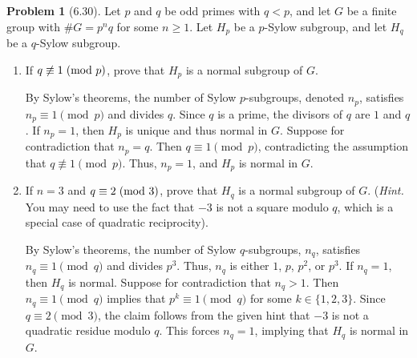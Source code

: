 \documentclass[12pt]{article}
\theoremstyle{definition}
\newtheorem{problem}{Problem}
\begin{document}
\begin{problem}[6.30]
    Let $p$ and $q$ be odd primes with $q < p$, and let $G$ be a finite group with $\#G = p^nq$ for some $n \geq 1$. 
    Let $H_p$ be a $p$-Sylow subgroup, and let $H_q$ be a $q$-Sylow subgroup.
    \begin{enumerate}[label=(\alph*)]
        \item If $q \not\equiv 1 \hspace{3px} (\text{mod } p)$, prove that $H_p$ is a normal subgroup of $G$.
        
        \begin{solution}
            By Sylow’s theorems, the number of Sylow $p$-subgroups, denoted $n_p$, satisfies $n_p \equiv 1 \pmod{p}$ and divides $q$. Since $q$ is a prime, the divisors of $q$ are $1$ and $q$. If $n_p = 1$, then $H_p$ is unique and thus normal in $G$. Suppose for contradiction that $n_p = q$. Then $q \equiv 1 \pmod{p}$, contradicting the assumption that $q \not\equiv 1 \pmod{p}$. Thus, $n_p = 1$, and $H_p$ is normal in $G$.
        \end{solution}

        \item If $n = 3$ and $q \equiv 2 \hspace{3px} (\text{mod } 3)$, prove that $H_q$ is a normal subgroup of $G$.
              (\textit{Hint.} You may need to use the fact that $-3$ is not a square modulo $q$, which is a special
              case of quadratic reciprocity).

        \begin{solution}
            By Sylow’s theorems, the number of Sylow $q$-subgroups, $n_q$, satisfies $n_q \equiv 1 \pmod{q}$ and divides $p^3$. Thus, $n_q$ is either $1$, $p$, $p^2$, or $p^3$. If $n_q = 1$, then $H_q$ is normal. Suppose for contradiction that $n_q > 1$. Then $n_q \equiv 1 \pmod{q}$ implies that $p^k \equiv 1 \pmod{q}$ for some $k \in \{1,2,3\}$. Since $q \equiv 2 \pmod{3}$, the claim follows from the given hint that $-3$ is not a quadratic residue modulo $q$. This forces $n_q = 1$, implying that $H_q$ is normal in $G$.
        \end{solution}
    \end{enumerate}
\end{problem}
\end{document}
